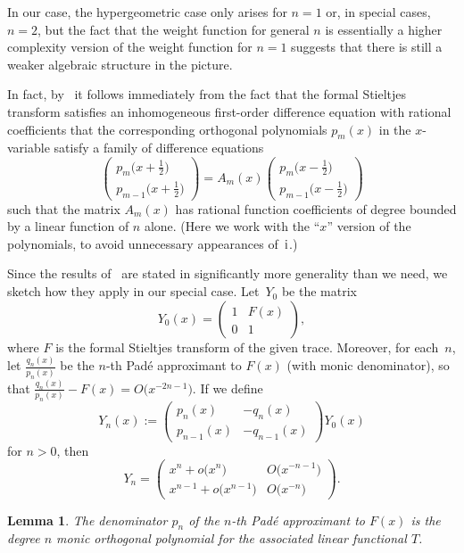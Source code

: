 \documentclass[pdftex]{sigma}
\newtheorem{Lemma}[Theorem]{Lemma}
\theoremstyle{definition}
\numberwithin{equation}{section}
\begin{document}
In our case, the hypergeometric case only arises for $n=1$ or, in special
cases, $n=2$, but the fact that the weight function for general $n$ is
essentially a higher complexity version of the weight function for $n=1$
suggests that there is still a weaker algebraic structure in the
picture.

In fact, by~\cite{Magnus} it follows immediately from the fact that the
formal Stieltjes transform satisfies an inhomogeneous first-order
difference equation with rational coefficients that the corresponding orthogonal
polynomials $p_m(x)$ in the $x$-variable satisfy a family of difference equations
\[
\begin{pmatrix}
p_m\big(x+\frac{1}{2}\big)\\[1ex]
p_{m-1}\big(x+\frac{1}{2}\big)
\end{pmatrix}
= A_m(x)
\begin{pmatrix}
p_m\big(x-\tfrac{1}{2}\big)\\[1ex]
p_{m-1}\big(x-\tfrac{1}{2}\big)
\end{pmatrix}
\]
such that the matrix $A_m(x)$ has rational function coefficients of degree
bounded by a linear function of $n$ alone. (Here we work with the ``$x$''
version of the polynomials, to avoid unnecessary appearances of~${\rm i}$.)

Since the results of~\cite{Magnus} are stated in significantly more
generality than we need, we sketch how they apply in our special case. Let~$Y_0$ be the matrix
\[
Y_0(x) = \begin{pmatrix} 1 & F(x) \\ 0 & 1\end{pmatrix} ,
\]
where $F$ is the formal Stieltjes transform of the given trace. Moreover,
for each~$n$, let $\frac{q_n(x)}{p_n(x)}$ be the $n$-th Pad\'e approximant to $F(x)$
(with monic denominator), so that $\frac{q_n(x)}{p_n(x)}-F(x)=O\big(x^{-2n-1}\big)$. If we
define
\[
Y_n(x):= \begin{pmatrix} p_n(x) & -q_n(x)\\ p_{n-1}(x) & -q_{n-1}(x)\end{pmatrix}
Y_0(x)
\]
for $n>0$, then
\[
Y_n = \begin{pmatrix} x^n+o\big(x^n\big) & O\big(x^{-n-1}\big)\\
 x^{n-1}+o\big(x^{n-1}\big) & O\big(x^{-n}\big)\end{pmatrix} .
\]

\begin{Lemma}
 The denominator $p_n$ of the $n$-th Pad\'e approximant to $F(x)$ is the
 degree $n$ monic orthogonal polynomial for the associated linear
 functional $T$.
\end{Lemma}
\end{document}
